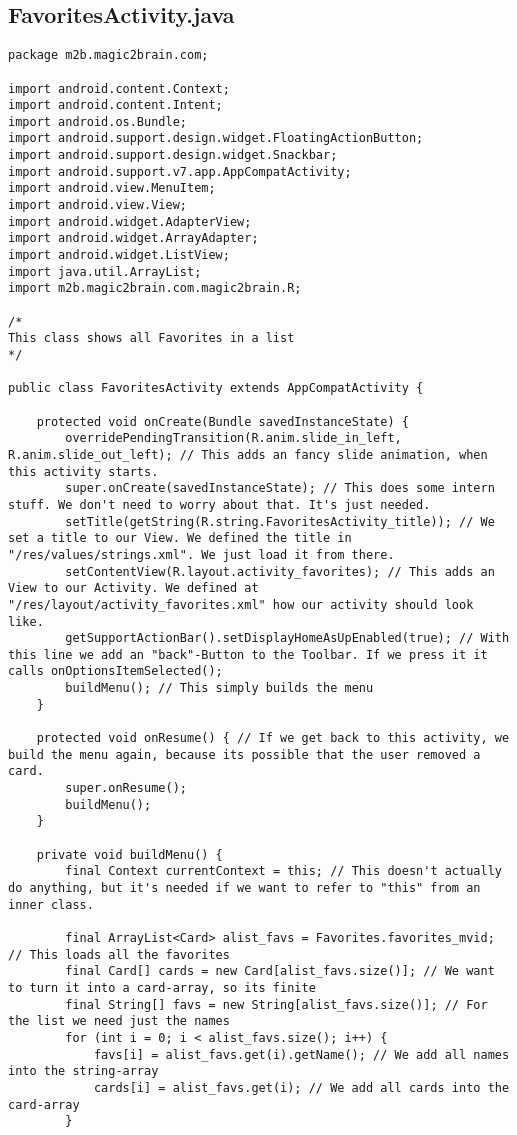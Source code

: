 \subsection{FavoritesActivity.java}
\begin{lstlisting}
package m2b.magic2brain.com;

import android.content.Context;
import android.content.Intent;
import android.os.Bundle;
import android.support.design.widget.FloatingActionButton;
import android.support.design.widget.Snackbar;
import android.support.v7.app.AppCompatActivity;
import android.view.MenuItem;
import android.view.View;
import android.widget.AdapterView;
import android.widget.ArrayAdapter;
import android.widget.ListView;
import java.util.ArrayList;
import m2b.magic2brain.com.magic2brain.R;

/*
This class shows all Favorites in a list
*/

public class FavoritesActivity extends AppCompatActivity {

    protected void onCreate(Bundle savedInstanceState) {
        overridePendingTransition(R.anim.slide_in_left, R.anim.slide_out_left); // This adds an fancy slide animation, when this activity starts.
        super.onCreate(savedInstanceState); // This does some intern stuff. We don't need to worry about that. It's just needed.
        setTitle(getString(R.string.FavoritesActivity_title)); // We set a title to our View. We defined the title in "/res/values/strings.xml". We just load it from there.
        setContentView(R.layout.activity_favorites); // This adds an View to our Activity. We defined at "/res/layout/activity_favorites.xml" how our activity should look like.
        getSupportActionBar().setDisplayHomeAsUpEnabled(true); // With this line we add an "back"-Button to the Toolbar. If we press it it calls onOptionsItemSelected();
        buildMenu(); // This simply builds the menu
    }

    protected void onResume() { // If we get back to this activity, we build the menu again, because its possible that the user removed a card.
        super.onResume();
        buildMenu();
    }

    private void buildMenu() {
        final Context currentContext = this; // This doesn't actually do anything, but it's needed if we want to refer to "this" from an inner class.

        final ArrayList<Card> alist_favs = Favorites.favorites_mvid; // This loads all the favorites
        final Card[] cards = new Card[alist_favs.size()]; // We want to turn it into a card-array, so its finite
        final String[] favs = new String[alist_favs.size()]; // For the list we need just the names
        for (int i = 0; i < alist_favs.size(); i++) {
            favs[i] = alist_favs.get(i).getName(); // We add all names into the string-array
            cards[i] = alist_favs.get(i); // We add all cards into the card-array
        }


\end{lstlisting}

